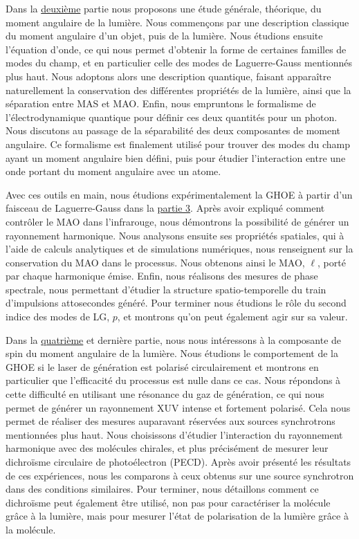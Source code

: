 Dans la \hyperref[PA:LightAM]{deuxième} partie nous proposons une étude générale, théorique, du moment angulaire de la lumière. Nous commençons par une description classique du moment angulaire d'un objet, puis de la lumière. Nous étudions ensuite l'équation d'onde, ce qui nous permet d'obtenir la forme de certaines familles de modes du champ, et en particulier celle des modes de Laguerre-Gauss mentionnés plus haut. Nous adoptons alors une description quantique, faisant apparaître naturellement la conservation des différentes propriétés de la lumière, ainsi que la séparation entre MAS et MAO. Enfin, nous empruntons le formalisme de l'électrodynamique quantique pour définir ces deux quantités pour un photon. Nous discutons au passage de la séparabilité des deux composantes de moment angulaire. Ce formalisme est finalement utilisé pour trouver des modes du champ ayant un moment angulaire bien défini, puis pour étudier l'interaction entre une onde portant du moment angulaire avec un atome.

Avec ces outils en main, nous étudions expérimentalement la GHOE à partir d'un faisceau de Laguerre-Gauss dans la \hyperref[PA:OAM_HHG]{partie 3}. Après avoir expliqué comment contrôler le MAO dans l'infrarouge, nous démontrons la possibilité de générer un rayonnement harmonique. Nous analysons ensuite ses propriétés spatiales, qui à l'aide de calculs analytiques et de simulations numériques, nous renseignent sur la conservation du MAO dans le processus. Nous obtenons ainsi le MAO, $\ell$, porté par chaque harmonique émise. Enfin, nous réalisons des mesures de phase spectrale, nous permettant d'étudier la structure spatio-temporelle du train d'impulsions attosecondes généré. Pour terminer nous étudions le rôle du second indice des modes de LG, $p$, et montrons qu'on peut également agir sur sa valeur.

Dans la \hyperref[PA:Spin_HHG]{quatrième} et dernière partie, nous nous intéressons à la composante de spin du moment angulaire de la lumière. Nous étudions le comportement de la GHOE si le laser de génération est polarisé circulairement et montrons en particulier que l'efficacité du processus est nulle dans ce cas. Nous répondons à cette difficulté en utilisant une résonance du gaz de génération, ce qui nous permet de générer un rayonnement XUV intense et fortement polarisé. Cela nous permet de réaliser des mesures auparavant réservées aux sources synchrotrons mentionnées plus haut. Nous choisissons d'étudier l'interaction du rayonnement harmonique avec des molécules chirales, et plus précisément de mesurer leur dichroïsme circulaire de photoélectron (PECD). Après avoir présenté les résultats de ces expériences, nous les comparons à ceux obtenus sur une source synchrotron dans des conditions similaires. Pour terminer, nous détaillons comment ce dichroïsme peut également être utilisé, non pas pour caractériser la molécule grâce à la lumière, mais pour mesurer l'état de polarisation de la lumière grâce à la molécule.


